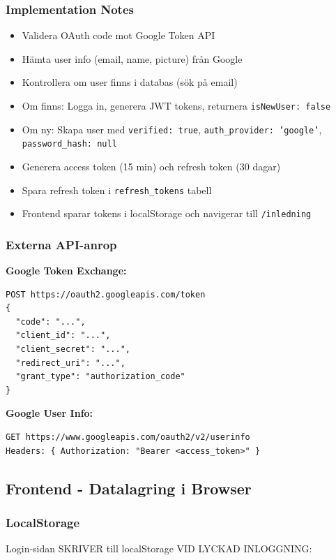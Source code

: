 \documentclass[12pt,a4paper]{article}
\begin{document}
\subsubsection{Implementation Notes}
\begin{itemize}[noitemsep]
  \item Validera OAuth code mot Google Token API
  \item Hämta user info (email, name, picture) från Google
  \item Kontrollera om user finns i databas (sök på email)
  \item Om finns: Logga in, generera JWT tokens, returnera \texttt{isNewUser: false}
  \item Om ny: Skapa user med \texttt{verified: true}, \texttt{auth\_provider: 'google'}, \texttt{password\_hash: null}
  \item Generera access token (15 min) och refresh token (30 dagar)
  \item Spara refresh token i \texttt{refresh\_tokens} tabell
  \item Frontend sparar tokens i localStorage och navigerar till \texttt{/inledning}
\end{itemize}

\subsubsection{Externa API-anrop}
\textbf{Google Token Exchange:}
\begin{verbatim}
POST https://oauth2.googleapis.com/token
{
  "code": "...",
  "client_id": "...",
  "client_secret": "...",
  "redirect_uri": "...",
  "grant_type": "authorization_code"
}
\end{verbatim}

\textbf{Google User Info:}
\begin{verbatim}
GET https://www.googleapis.com/oauth2/v2/userinfo
Headers: { Authorization: "Bearer <access_token>" }
\end{verbatim}

\subsection{Frontend - Datalagring i Browser}

\subsubsection{LocalStorage}
Login-sidan SKRIVER till localStorage VID LYCKAD INLOGGNING:
\end{document}
